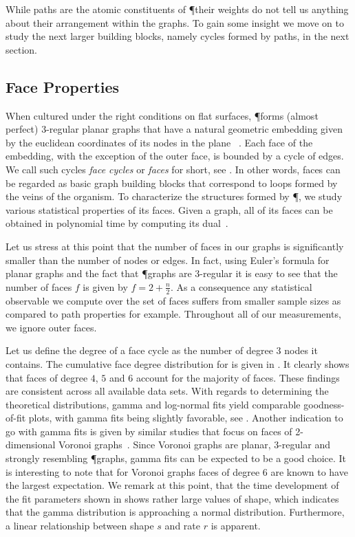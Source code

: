		While paths are the atomic constituents of \P their weights do not tell us anything about their arrangement within the graphs. To gain some insight we move on to study the next larger building blocks, namely cycles formed by paths, in the next section.

	\subsection{Face Properties}

		When cultured under the right conditions on flat surfaces, \P forms (almost perfect) $3$-regular planar graphs that have a natural geometric embedding given by the euclidean coordinates of its nodes in the plane ~\cite{baumgarten2010plasmodial}. Each face of the embedding, with the exception of the outer face, is bounded by a cycle of edges. We call such cycles \emph{face cycles} or \emph{faces} for short, see . In other words, faces can be regarded as basic graph building blocks that correspond to loops formed by the veins of the organism. To characterize the structures formed by \P, we study various statistical properties of its faces. Given a graph, all of its faces can be obtained in polynomial time by computing its dual~\cite{mehlhorn1995leda}. 

		Let us stress at this point that the number of faces in our graphs is significantly smaller than the number of nodes or edges. In fact, using Euler's formula for planar graphs and the fact that \P graphs are $3$-regular it is easy to see that the number of faces $f$ is given by $f = 2 + \frac{n}{2}$. As a consequence any statistical observable we compute over the set of faces suffers from smaller sample sizes as compared to path properties for example. Throughout all of our measurements, we ignore outer faces.

		Let us define the degree of a face cycle as the number of degree $3$ nodes it contains.	The cumulative face degree distribution for  is given in . It clearly shows that faces of degree $4$, $5$ and $6$ account for the majority of faces. These findings are consistent across all available data sets. With regards to determining the theoretical distributions, gamma and log-normal fits yield comparable goodness-of-fit plots, with gamma fits being slightly favorable, see . Another indication to go with gamma fits is given by similar studies that focus on faces of 2-dimensional Voronoi graphs~\cite{hinde1980monte,tanemura2003statistical}. Since Voronoi graphs are planar, $3$-regular and strongly resembling \P graphs, gamma fits can be expected to be a good choice. It is interesting to note that for Voronoi graphs faces of degree $6$ are known to have the largest expectation. We remark at this point, that the time development of the fit parameters shown in  shows rather large values of shape, which indicates that the gamma distribution is approaching a normal distribution. Furthermore, a linear relationship between shape $s$ and rate $r$ is apparent.
 
